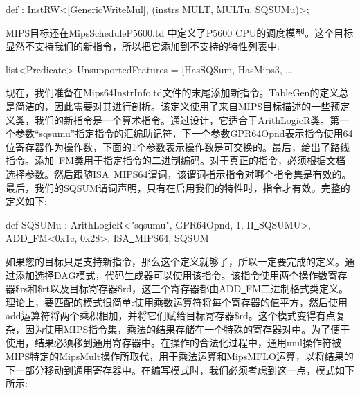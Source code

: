 \begin{tcolorbox}[colback=white,colframe=black]
def : InstRW<[GenericWriteMul], (instrs MULT, MULTu, SQSUMu)>;
\end{tcolorbox}

MIPS目标还在MipsScheduleP5600.td 中定义了P5600 CPU的调度模型。这个目标显然不支持我们的新指令，所以把它添加到不支持的特性列表中:\par

\begin{tcolorbox}[colback=white,colframe=black]
list<Predicate> UnsupportedFeatures = [HasSQSum, HasMips3, … 
\end{tcolorbox}

现在，我们准备在Mips64InstrInfo.td文件的末尾添加新指令。TableGen的定义总是简洁的，因此需要对其进行剖析。该定义使用了来自MIPS目标描述的一些预定义类，我们的新指令是一个算术指令。通过设计，它适合于ArithLogicR类。第一个参数“sqsumu”指定指令的汇编助记符，下一个参数GPR64Opnd表示指令使用64位寄存器作为操作数，下面的1个参数表示操作数是可交换的。最后，给出了路线指令。添加\underline{~}FM类用于指定指令的二进制编码。对于真正的指令，必须根据文档选择参数。然后跟随ISA\underline{~}MIPS64谓词，该谓词指示指令对哪个指令集是有效的。最后，我们的SQSUM谓词声明，只有在启用我们的特性时，指令才有效。完整的定义如下:\par

\begin{tcolorbox}[colback=white,colframe=black]
def SQSUMu : ArithLogicR<"sqsumu", GPR64Opnd, 1, II\underline{~}SQSUMU>, \\
\hspace*{4cm}ADD\underline{~}FM<0x1c, 0x28>, ISA\underline{~}MIPS64, SQSUM
\end{tcolorbox}

如果您的目标只是支持新指令，那么这个定义就够了，所以一定要完成的定义。通过添加选择DAG模式，代码生成器可以使用该指令。该指令使用两个操作数寄存器\$rs和\$rt以及目标寄存器\$rd，这三个寄存器都由ADD\underline{~}FM二进制格式类定义。理论上，要匹配的模式很简单:使用乘数运算符将每个寄存器的值平方，然后使用add运算符将两个乘积相加，并将它们赋给目标寄存器\$rd。这个模式变得有点复杂，因为使用MIPS指令集，乘法的结果存储在一个特殊的寄存器对中。为了便于使用，结果必须移到通用寄存器中。在操作的合法化过程中，通用mul操作符被MIPS特定的MipsMult操作所取代，用于乘法运算和MipsMFLO运算，以将结果的下一部分移动到通用寄存器中。在编写模式时，我们必须考虑到这一点，模式如下所示:\par

